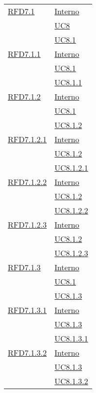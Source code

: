 \begin{longtable}{|>{\centering}m{5cm}|m{5cm}<{\centering}|}
\hyperlink{RFD7.1}{RFD7.1} & \hyperlink{Interno}{Interno}\\
& \hyperref[UC8]{UC8}\\
& \hyperref[UC8.1]{UC8.1}\\ \hline

\hyperlink{RFD7.1.1}{RFD7.1.1} & \hyperlink{Interno}{Interno}\\
& \hyperref[UC8.1]{UC8.1}\\
& \hyperref[UC8.1.1]{UC8.1.1}\\ \hline

\hyperlink{RFD7.1.2}{RFD7.1.2} & \hyperlink{Interno}{Interno}\\
& \hyperref[UC8.1]{UC8.1}\\
& \hyperref[UC8.1.2]{UC8.1.2}\\ \hline

\hyperlink{RFD7.1.2.1}{RFD7.1.2.1} & \hyperlink{Interno}{Interno}\\
& \hyperref[UC8.1.2]{UC8.1.2}\\
& \hyperref[UC8.1.2.1]{UC8.1.2.1}\\ \hline

\hyperlink{RFD7.1.2.2}{RFD7.1.2.2} & \hyperlink{Interno}{Interno}\\
& \hyperref[UC8.1.2]{UC8.1.2}\\
& \hyperref[UC8.1.2.2]{UC8.1.2.2}\\ \hline

\hyperlink{RFD7.1.2.3}{RFD7.1.2.3} & \hyperlink{Interno}{Interno}\\
& \hyperref[UC8.1.2]{UC8.1.2}\\
& \hyperref[UC8.1.2.3]{UC8.1.2.3}\\ \hline

\hyperlink{RFD7.1.3}{RFD7.1.3} & \hyperlink{Interno}{Interno}\\
& \hyperref[UC8.1]{UC8.1}\\
& \hyperref[UC8.1.3]{UC8.1.3}\\ \hline

\hyperlink{RFD7.1.3.1}{RFD7.1.3.1} & \hyperlink{Interno}{Interno}\\
& \hyperref[UC8.1.3]{UC8.1.3}\\
& \hyperref[UC8.1.3.1]{UC8.1.3.1}\\ \hline

\hyperlink{RFD7.1.3.2}{RFD7.1.3.2} & \hyperlink{Interno}{Interno}\\
& \hyperref[UC8.1.3]{UC8.1.3}\\
& \hyperref[UC8.1.3.2]{UC8.1.3.2}\\ \hline


\end{longtable}
